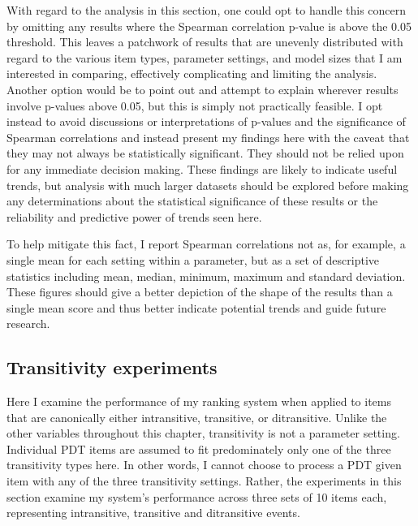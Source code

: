 With regard to the analysis in this section, one could opt to handle this concern by omitting any results where the Spearman correlation p-value is above the 0.05 threshold. This leaves a patchwork of results that are unevenly distributed with regard to the various item types, parameter settings, and model sizes that I am interested in comparing, effectively complicating and limiting the analysis. Another option would be to point out and attempt to explain wherever results involve p-values above 0.05, but this is simply not practically feasible. I opt instead to avoid discussions or interpretations of p-values and the significance of Spearman correlations and instead present my findings here with the caveat that they may not always be statistically significant. They should not be relied upon for any immediate decision making. These findings are likely to indicate useful trends, but analysis with much larger datasets should be explored before making any determinations about the statistical significance of these results or the reliability and predictive power of trends seen here.

To help mitigate this fact, I report Spearman correlations not as, for example, a single mean for each setting within a parameter, but as a set of descriptive statistics including mean, median, minimum, maximum and standard deviation. These figures should give a better depiction of the shape of the results than a single mean score and thus better indicate potential trends and guide future research.

\subsection{Transitivity experiments}
\label{sec:exp-transitivity}
Here I examine the performance of my ranking system when applied to items that are canonically either intransitive, transitive, or ditransitive. Unlike the other variables throughout this chapter, transitivity is not a parameter setting. Individual PDT items are assumed to fit predominately only one of the three transitivity types here. In other words, I cannot choose to process a PDT given item with any of the three transitivity settings. Rather, the experiments in this section examine my system's performance across three sets of 10 items each, representing intransitive, transitive and ditransitive events.


